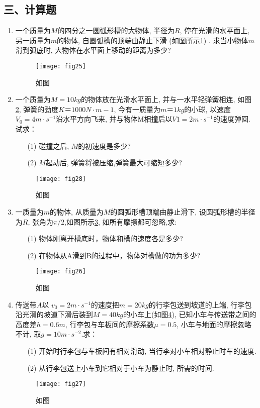 \subsection*{三、计算题}
\begin{enumerate}
    \item 一个质量为$M$的四分之一圆弧形槽的大物体, 半径为$R$, 停在光滑的水平面上, 另一质量为$m$的物体, 自圆弧槽的顶端由静止下滑 (如图所示\ref{fig:25}) .
    求当小物体$m$滑到弧底时, 大物体在水平面上移动的距离为多少?
    \begin{figure}[H]
        \centering
        \texttt{[image: fig25]}
            \caption{如图}\label{fig:25}
    \end{figure}
    \item 一个质量为$M=10kg$的物体放在光滑水平面上, 并与一水平轻弹簧相连, 如图\ref{fig:28}, 弹簧的劲度$K＝1000N·m-1$, 今有一质量为$m＝1kg$的小球, 
    以速度$V_0=4m\cdot s^{-1}$沿水平方向飞来, 并与物体M相撞后以$V1=2m\cdot s^{-1}$的速度弹回.试求：
    \begin{enumerate}
        \item[(1)] 碰撞之后, $M$的初速度是多少?
        \item[(2)] $M$起动后, 弹簧将被压缩,弹簧最大可缩短多少?
    \end{enumerate}
        \begin{figure}[H]
            \centering
            \texttt{[image: fig28]}
                \caption{如图}\label{fig:28}
        \end{figure}
     \item 一质量为$m$的物体, 从质量为$M$的圆弧形槽顶端由静止滑下, 设圆弧形槽的半径为$R$, 张角为$\pi/2$,如图所示\ref{fig:26}, 如所有摩擦都可忽略,求:
    \begin{enumerate}
            
    \item[(1)] 物体刚离开槽底时，物体和槽的速度各是多少?
    \item[(2)] 在物体从A滑到B的过程中，物体对槽做的功为多少?
    \end{enumerate}
        \begin{figure}[ht]
            \centering
            \texttt{[image: fig26]}
                \caption{如图}\label{fig:26}
        \end{figure}
    \item 传送带$A$以 $v_0=2m\cdot s^{-1}$的速度把$m=20kg$的行李包送到坡道的上端, 行李包沿光滑的坡道下滑后装到$M=40kg$的小车上(如图\ref{fig:27}), 已知小车与传送带之间的高度差$h=0.6m$,
    行李包与车板间的摩擦系数$\mu =0.5$, 小车与地面的摩擦忽略不计, 取$g=10m\cdot s^{-2}$.求：
    \begin{enumerate}
        \item[(1)] 开始时行李包与车板间有相对滑动, 当行李对小车相对静止时车的速度.
        \item[(2)] 从行李包送上小车到它相对于小车为静止时, 所需的时间.	
    \end{enumerate}
    \begin{figure}[H]
        \centering
        \texttt{[image: fig27]}
            \caption{如图}\label{fig:27}
    \end{figure}
    

\end{enumerate}
